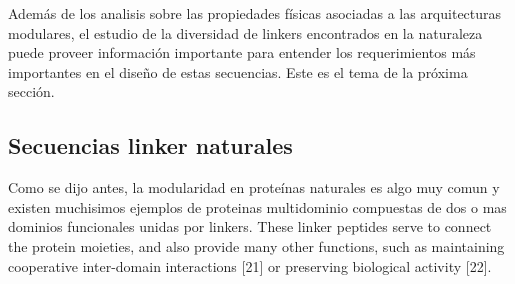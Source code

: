 


% 

Además de los analisis sobre las propiedades físicas asociadas a las arquitecturas modulares, el estudio de la diversidad de linkers encontrados en la naturaleza puede proveer información importante para entender los requerimientos
más importantes en el diseño de estas secuencias.
Este es el tema de la próxima sección.






























\subsection{Secuencias linker naturales}


Como se dijo antes, la modularidad en proteínas naturales es algo muy comun y existen muchisimos ejemplos de proteinas multidominio compuestas de dos o mas dominios funcionales unidas por linkers.
These linker peptides serve to connect the protein moieties, and also provide many other functions, such as maintaining cooperative inter-domain interactions [21] or preserving biological activity [22]. 

